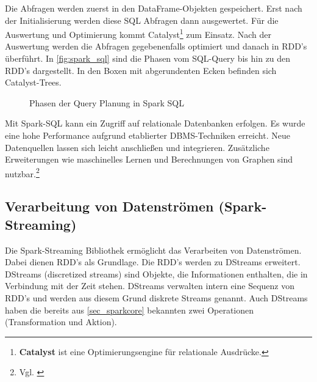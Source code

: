 \noindent
Die Abfragen werden zuerst in den DataFrame-Objekten gespeichert. Erst nach der Initialisierung werden diese SQL Abfragen dann ausgewertet. Für die Auswertung und Optimierung kommt Catalyst\footnote{\textbf{Catalyst} ist eine Optimierungsengine für relationale Ausdrücke.} zum Einsatz. Nach der Auswertung werden die Abfragen gegebenenfalls optimiert und danach in RDD's überführt. In \autoref{fig:spark_sql} sind die Phasen vom SQL-Query bis hin zu den RDD's dargestellt. In den Boxen mit abgerundenten Ecken befinden sich Catalyst-Trees.

\begin{figure}[h]
  \centering
  \caption{Phasen der Query Planung in Spark SQL \cite{AXL+15}}\label{fig:spark_sql}
\end{figure}

\noindent
Mit Spark-SQL kann ein Zugriff auf relationale Datenbanken erfolgen. Es wurde eine hohe Performance aufgrund etablierter DBMS-Techniken erreicht.
Neue Datenquellen lassen sich leicht anschließen und integrieren.
Zusätzliche Erweiterungen wie maschinelles Lernen und Berechnungen von Graphen sind nutzbar.\footnote{Vgl. \cite{AXL+15}} \\







\newpage
\subsection{Verarbeitung von Datenströmen (Spark-Streaming)}


Die Spark-Streaming Bibliothek ermöglicht das Verarbeiten von Datenströmen. Dabei dienen RDD's als Grundlage. Die RDD's werden zu DStreams erweitert. DStreams (discretized streams) sind Objekte, die Informationen enthalten, die in Verbindung mit der Zeit stehen. DStreams verwalten intern eine Sequenz von RDD's und werden aus diesem Grund diskrete Streams genannt.
Auch DStreams haben die bereits aus \ref{sec_sparkcore} bekannten zwei Operationen (Transformation und Aktion). \\

